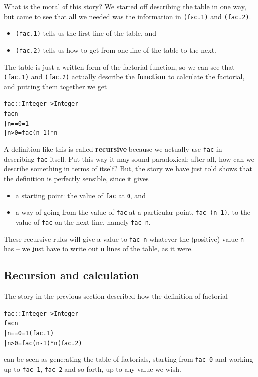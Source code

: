 What is the moral of this story? We started off describing the table in
one way, but came to see that all we needed was the information in
\texttt{(fac.1)} and \texttt{(fac.2)}.
\begin{itemize}
\item \texttt{(fac.1)} tells us the first line of the table, and
\item \texttt{(fac.2)} tells us how to get from one line of the table to
the next.
\end{itemize}
The table is just a written form of the factorial function, so we can
see that
\texttt{(fac.1)} and \texttt{(fac.2)}
actually describe the \textbf{function} to calculate the factorial, and
putting them together we get
\begin{alltt}
fac :: Integer -> Integer
fac n
  | n==0        = 1
  | n>0         = fac (n-1) * n
\end{alltt}
A definition like this is called \textbf{recursive} because we actually
use \texttt{fac} in describing \texttt{fac}
itself. Put this way it may sound paradoxical: after all,
how can we describe something in
terms of itself? But, the story we have just told shows that the definition
is perfectly sensible, since it gives
\begin{itemize}
\item a starting point: the value of \texttt{fac} at \texttt{0}, and
\item a way of going from the value of \texttt{fac} at a particular
point, \texttt{fac (n-1)}, to the value of \texttt{fac} on the next
line, namely \texttt{fac n}.
\end{itemize}
These recursive rules will give a value to \texttt{fac n} whatever the
(positive) value \texttt{n}
has -- we just have to write out \texttt{n}
lines of the table, as it were.


\subsection*{Recursion and calculation}

The story in the previous section described how the definition of factorial
\begin{alltt}
fac :: Integer -> Integer
fac n
  | n==0        = 1\hfill(fac.1)
  | n>0         = fac (n-1) * n\hfill(fac.2)
\end{alltt}
can be seen as generating the table of factorials, starting from \texttt{fac
0} and working up to \texttt{fac 1}, \texttt{fac 2} and so forth, up to
any value we wish.

